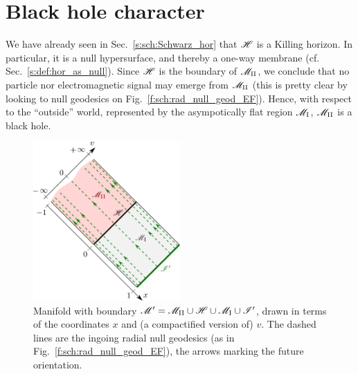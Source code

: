 
\section{Black hole character} \label{s:sch:BH}

We have already seen in Sec.~\ref{s:sch:Schwarz_hor} that $\mathscr{H}$ is
a Killing horizon. In particular, it is a null hypersurface, and thereby a
one-way membrane (cf. Sec.~\ref{s:def:hor_as_null}).
Since $\mathscr{H}$ is the boundary of $\mathscr{M}_{\rm II}$, we conclude that no particle nor
electromagnetic signal may emerge from $\mathscr{M}_{\rm II}$
(this is pretty clear by looking to null geodesics on
Fig.~\ref{f:sch:rad_null_geod_EF}). Hence, with respect to the ``outside''
world, represented by the asympotically flat region $\mathscr{M}_{\rm I}$,
$\mathscr{M}_{\rm II}$ is a black hole.

\begin{figure}
\centerline{\includegraphics[width=0.5\textwidth]{sch_conf_compl1.pdf}}
\caption[]{\label{f:sch:conf_compl1} \footnotesize
Manifold with boundary
$\mathscr{M}' = \mathscr{M}_{\rm II}\cup\mathscr{H}\cup\mathscr{M}_{\rm I}\cup\mathscr{I}'$, drawn in terms of
the coordinates $x$ and (a compactified version of) $v$.
The dashed lines are the ingoing radial null geodesics (as in Fig.~\ref{f:sch:rad_null_geod_EF}), the arrows marking the future orientation.}
\end{figure}


